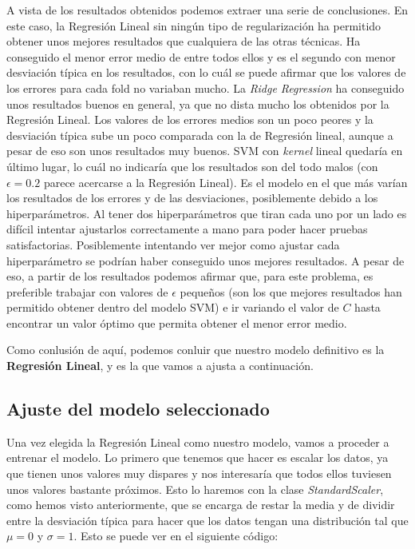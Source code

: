 \documentclass[11pt,a4paper]{article}
\begin{document}
A vista de los resultados obtenidos podemos extraer una serie de
conclusiones. En este caso, la Regresión Lineal sin ningún tipo de
regularización ha permitido obtener unos mejores resultados que
cualquiera de las otras técnicas. Ha conseguido el menor error medio de
entre todos ellos y es el segundo con menor desviación típica en los
resultados, con lo cuál se puede afirmar que los valores de los errores
para cada fold no variaban mucho. La \emph{Ridge Regression} ha
conseguido unos resultados buenos en general, ya que no dista mucho los
obtenidos por la Regresión Lineal. Los valores de los errores medios son
un poco peores y la desviación típica sube un poco comparada con la de
Regresión lineal, aunque a pesar de eso son unos resultados muy buenos.
SVM con \emph{kernel} lineal quedaría en último lugar, lo cuál no
indicaría que los resultados son del todo malos (con \(\epsilon = 0.2\)
parece acercarse a la Regresión Lineal). Es el modelo en el que más
varían los resultados de los errores y de las desviaciones, posiblemente
debido a los hiperparámetros. Al tener dos hiperparámetros que tiran
cada uno por un lado es difícil intentar ajustarlos correctamente a mano
para poder hacer pruebas satisfactorias. Posiblemente intentando ver
mejor como ajustar cada hiperparámetro se podrían haber conseguido unos
mejores resultados. A pesar de eso, a partir de los resultados podemos
afirmar que, para este problema, es preferible trabajar con valores de
\(\epsilon\) pequeños (son los que mejores resultados han permitido
obtener dentro del modelo SVM) e ir variando el valor de \(C\) hasta
encontrar un valor óptimo que permita obtener el menor error medio.

Como conlusión de aquí, podemos conluir que nuestro modelo definitivo es
la \textbf{Regresión Lineal}, y es la que vamos a ajusta a continuación.

    \subsection{Ajuste del modelo
seleccionado}\label{ajuste-del-modelo-seleccionado}

Una vez elegida la Regresión Lineal como nuestro modelo, vamos a
proceder a entrenar el modelo. Lo primero que tenemos que hacer es
escalar los datos, ya que tienen unos valores muy dispares y nos
interesaría que todos ellos tuviesen unos valores bastante próximos.
Esto lo haremos con la clase \emph{StandardScaler}, como hemos visto
anteriormente, que se encarga de restar la media y de dividir entre la
desviación típica para hacer que los datos tengan una distribución tal
que \(\mu = 0\) y \(\sigma = 1\). Esto se puede ver en el siguiente
código:
\end{document}
